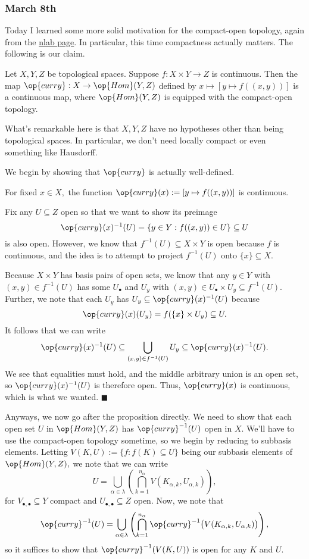 \subsubsection{March 8th}
Today I learned some more solid motivation for the compact-open topology, again from the \href{https://ncatlab.org/nlab/show/compact-open+topology}{nlab page}. In particular, this time compactness actually matters. The following is our claim.
\begin{proposition}
    Let $X,Y,Z$ be topological spaces. Suppose $f:X\times Y\to Z$ is continuous. Then the map $\op{curry}:X\to\op{Hom}(Y,Z)$ defined by $x\mapsto[y\mapsto f((x,y))]$ is a continuous map, where $\op{Hom}(Y,Z)$ is equipped with the compact-open topology.
\end{proposition}
What's remarkable here is that $X,Y,Z$ have no hypotheses other than being topological spaces. In particular, we don't need locally compact or even something like Hausdorff.

We begin by showing that $\op{curry}$ is actually well-defined.
\begin{lemma}
    For fixed $x\in X,$ the function $\op{curry}(x):=[y\mapsto f((x,y))]$ is continuous.
\end{lemma}
Fix any $U\subseteq Z$ open so that we want to show its preimage
\[\op{curry}(x)^{-1}(U)=\{y\in Y:f((x,y))\in U\}\subseteq U\]
is also open. However, we know that $f^{-1}(U)\subseteq X\times Y$ is open because $f$ is continuous, and the idea is to attempt to project $f^{-1}(U)$ onto $\{x\}\subseteq X.$

Because $X\times Y$ has basis pairs of open sets, we know that any $y\in Y$ with $(x,y)\in f^{-1}(U)$ has some $U_\bullet$ and $U_y$ with $(x,y)\in U_\bullet\times U_y\subseteq f^{-1}(U).$ Further, we note that each $U_y$ has $U_y\subseteq\op{curry}(x)^{-1}(U)$ because
\[\op{curry}(x)(U_y)=f(\{x\}\times U_y)\subseteq U.\]
It follows that we can write
\[\op{curry}(x)^{-1}(U)\subseteq\bigcup_{(x,y)\in f^{-1}(U)}U_y\subseteq\op{curry}(x)^{-1}(U).\]
We see that equalities must hold, and the middle arbitrary union is an open set, so $\op{curry}(x)^{-1}(U)$ is therefore open. Thus, $\op{curry}(x)$ is continuous, which is what we wanted. $\blacksquare$

Anyways, we now go after the proposition directly. We need to show that each open set $U$ in $\op{Hom}(Y,Z)$ has $\op{curry}^{-1}(U)$ open in $X.$ We'll have to use the compact-open topology sometime, so we begin by reducing to subbasis elements. Letting $V(K,U):=\{f:f(K)\subseteq U\}$ being our subbasis elements of $\op{Hom}(Y,Z),$ we note that we can write
\[U=\bigcup_{\alpha\in\lambda}\left(\bigcap_{k=1}^{n_\alpha}V(K_{\alpha,k},U_{\alpha,k})\right),\]
for $V_{\bullet,\bullet}\subseteq Y$ compact and $U_{\bullet,\bullet}\subseteq Z$ open. Now, we note that
\[\op{curry}^{-1}(U)=\bigcup_{\alpha\in\lambda}\left(\bigcap_{k=1}^{n_\alpha}\op{curry}^{-1}\big(V(K_{\alpha,k},U_{\alpha,k})\big)\right),\]
so it suffices to show that $\op{curry}^{-1}(V(K,U))$ is open for any $K$ and $U.$

